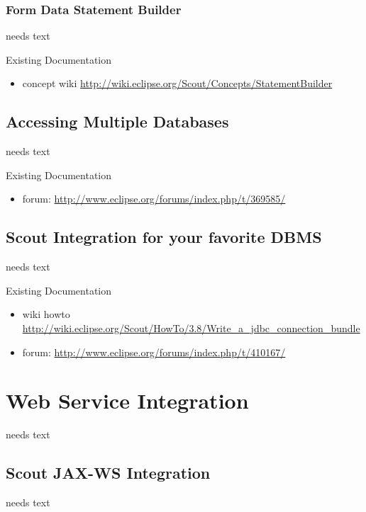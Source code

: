 \documentclass[a4paper,10pt,twoside]{book}
\begin{document}
\subsection{Form Data Statement Builder}
needs text

\noindent Existing Documentation
\begin{itemize}
  \item concept wiki \url{http://wiki.eclipse.org/Scout/Concepts/StatementBuilder}
\end{itemize}

\section{Accessing Multiple Databases}
needs text

\noindent Existing Documentation
\begin{itemize}
  \item forum: \url{http://www.eclipse.org/forums/index.php/t/369585/}
\end{itemize}

\section{Scout Integration for your favorite DBMS}
needs text

\noindent Existing Documentation
\begin{itemize}
  \item wiki howto \url{http://wiki.eclipse.org/Scout/HowTo/3.8/Write_a_jdbc_connection_bundle}
  \item forum: \url{http://www.eclipse.org/forums/index.php/t/410167/}
\end{itemize}

\chapter{Web Service Integration}
needs text

\section{Scout JAX-WS Integration}
needs text
\end{document}
